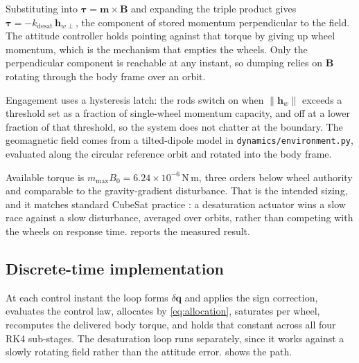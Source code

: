 \documentclass[conference,10pt,a4paper]{IEEEtran}
\newcommand{\vect}[1]{\bm{#1}}
\newcommand{\unit}[1]{\ensuremath{\,\mathrm{#1}}}
\begin{document}
Substituting into $\vect{\tau}=\vect{m}\times\vect{B}$ and expanding the triple
product gives $\vect{\tau} = -k_\text{desat}\,\vect{h}_{w\perp}$, the component
of stored momentum perpendicular to the field. The attitude controller holds
pointing against that torque by giving up wheel momentum, which is the
mechanism that empties the wheels. Only the perpendicular component is
reachable at any instant, so dumping relies on $\vect{B}$ rotating through the
body frame over an orbit.

Engagement uses a hysteresis latch: the rods switch on when $\|\vect{h}_w\|$
exceeds a threshold set as a fraction of single-wheel momentum capacity, and
off at a lower fraction of that threshold, so the system does not chatter at
the boundary. The geomagnetic field comes from a tilted-dipole model in
\texttt{dynamics/environment.py}, evaluated along the circular reference orbit
and rotated into the body frame.

Available torque is $m_\text{max}B_0 = 6.24\times10^{-6}\unit{N\,m}$, three
orders below wheel authority and comparable to the gravity-gradient
disturbance. That is the intended sizing, and it matches standard CubeSat
practice \cite{sidi,wertz}: a desaturation actuator wins a slow race against a
slow disturbance, averaged over orbits, rather than competing with the wheels
on response time.  reports the measured
result.

\subsection{Discrete-time implementation}
\label{sec:discrete}

At each control instant the loop forms $\delta\vect{q}$ and applies the sign
correction, evaluates the control law, allocates by \cref{eq:allocation},
saturates per wheel, recomputes the delivered body torque, and holds that
constant across all four RK4 sub-stages. The desaturation loop runs separately,
since it works against a slowly rotating field rather than the attitude error.
 shows the path.
\end{document}
